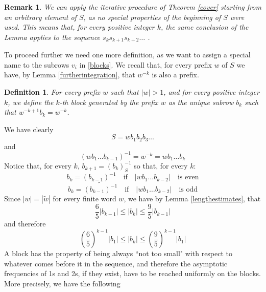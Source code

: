 \documentclass[10pt,a4paper]{article}
\newtheorem{rem}{Remark}
\newtheorem{defi}{Definition}
\begin{document}
\begin{rem}
We can apply the iterative procedure of Theorem \ref{cover} starting from an arbitrary element of $S$, as no special properties of the beginning of $S$ were used. This means that, for every positive integer $k$, the same conclusion of the Lemma applies to the sequence $s_k s_{k+1}s_{k+2}\dots$ .
\label{rempre}
\end{rem}


To proceed further we need one more definition, as we want to assign a special name to the subrows $v_i$ in \eqref{blocks}. We recall that, for every prefix $w$ of $S$ we have, by Lemma \ref{furtherintegration}, that $w^{-k}$ is also a prefix. 
\begin{defi} For every prefix $w$ such that $|w|>1$, and for every positive integer $k$, we define the $k$-th block generated by the prefix $w$ as the unique subrow  $b_k$ such that $w^{-k+1}b_k=w^{-k}$. \label{blocksdefi}\end{defi}
 We have clearly 
\begin{equation}
S=wb_1b_2b_3\dots
\label{blocksdef}
\end{equation}
and 
\begin{equation}(wb_1\dots b_{k-1})^{-1}=w^{-k}=wb_1\dots b_{k}\label{blocksdef2}\end{equation}
 Notice that, for every $k$, $b_{k+1}=\left(b_k\right)^{-1}_S$ so that, for every $k$: $$b_k=(b_{k-1})^{-1} \quad \text{if}\quad |wb_1\dots b_{k-2}|\quad\text{is even}$$
$$b_k=\widetilde{(b_{k-1})^{-1}} \quad \text{if}\quad |wb_1\dots b_{k-2}|\quad\text{is odd}$$
Since $|w|=|\widetilde{w}|$ for every finite word $w$, we have by Lemma \ref{lengthestimates}, that \begin{equation}\frac{6}{5}|b_{k-1}|\le|b_k|\le \frac{9}{5}|b_{k-1}|\label{bbbbbb}\end{equation}
and therefore
\begin{equation}
\left(\frac{6}{5}\right)^{k-1}|b_1|\le|b_k|\le\left(\frac{9}{5}\right)^{k-1}|b_1|\label{blockslength}
\end{equation}
 A block has the property of being always ``not too small" with respect to whatever comes before it in the sequence, and therefore the asymptotic frequencies of 1s and 2s, if they exist, have to be reached uniformly on the blocks. More precisely, we have the following
\end{document}
